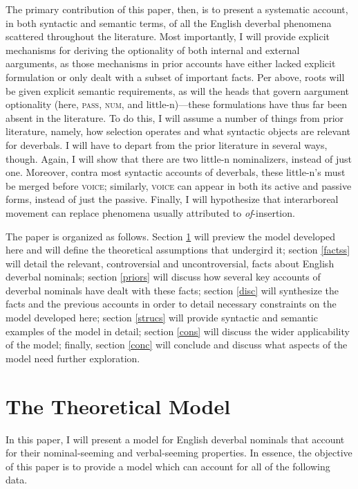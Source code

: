 \documentclass[12pt]{article}
\begin{document}
The primary contribution of this paper, then, is to present a systematic account, in both syntactic and semantic terms, of all the English deverbal phenomena scattered throughout the literature. Most importantly, I will provide explicit mechanisms for deriving the optionality of both internal and external aarguments, as those mechanisms in prior accounts have either lacked explicit formulation or only dealt with a subset of important facts. Per above, roots will be given explicit semantic requirements, as will the heads that govern aargument optionality (here, \textsc{pass}, \textsc{num}, and little-n)---these formulations have thus far been absent in the literature. To do this, I will assume a number of things from prior literature, namely, how selection operates and what syntactic objects are relevant for deverbals. I will have to depart from the prior literature in several ways, though. Again, I will show that there are two little-n nominalizers, instead of just one. Moreover, contra most syntactic accounts of deverbals, these little-n's must be merged before \textsc{voice}; similarly, \textsc{voice} can appear in both its active and passive forms, instead of just the passive. Finally, I will hypothesize that interarboreal movement can replace phenomena usually attributed to \textit{of}-insertion.

The paper is organized as follows. Section \ref{model} will preview the model developed here and will define the theoretical assumptions that undergird it; section \ref{factss} will detail the relevant, controversial and uncontroversial, facts about English deverbal nominals; section \ref{priors} will discuss how several key accounts of deverbal nominals have dealt with these facts; section \ref{disc} will synthesize the facts and the previous accounts in order to detail necessary constraints on the model developed here; section \ref{strucs} will provide syntactic and semantic examples of the model in detail; section \ref{cons} will discuss the wider applicability of the model; finally, section \ref{conc} will conclude and discuss what aspects of the model need further exploration.

\section{The Theoretical Model}\label{model}

In this paper, I will present a model for English deverbal nominals that account for their nominal-seeming and verbal-seeming properties. In essence, the objective of this paper is to provide a model which can account for all of the following data.
\end{document}
